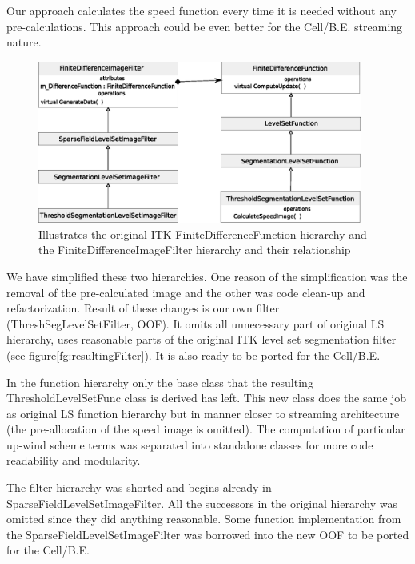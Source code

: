 \par
Our approach calculates the speed function every time it is needed without any pre-calculations.
This approach could be even better for the Cell/B.E. streaming nature.

\begin{figure}
    \centering
    \includegraphics[width=0.95\textwidth]{data/originalHierarchy}
    \caption[Original ITK thresholding level set filter class hierarchy]
{Illustrates the original ITK FiniteDifferenceFunction hierarchy and the FiniteDifferenceImageFilter hierarchy and their relationship}
    \label{fg:originalHierarchy}
\end{figure}

\par
We have simplified these two hierarchies.
One reason of the simplification was the removal of the pre-calculated image and the other was code clean-up and refactorization.
Result of these changes is our own filter (ThreshSegLevelSetFilter, OOF).
It omits all unnecessary part of original LS hierarchy, uses reasonable parts of the original ITK level set segmentation filter (see figure\ref{fg:resultingFilter}).
It is also ready to be ported for the Cell/B.E.

\par
In the function hierarchy only the base class that the resulting ThresholdLevelSetFunc class is derived has left.
This new class does the same job as original LS function hierarchy but in manner closer to streaming architecture (the pre-allocation of the speed image is omitted).
The computation of particular up-wind scheme terms was separated into standalone classes for more code readability and modularity.
\par
The filter hierarchy was shorted and begins already in SparseFieldLevelSetImageFilter.
All the successors in the original hierarchy was omitted since they did anything reasonable.
Some function implementation from the SparseFieldLevelSetImageFilter was borrowed into the new OOF to be ported for the Cell/B.E.

